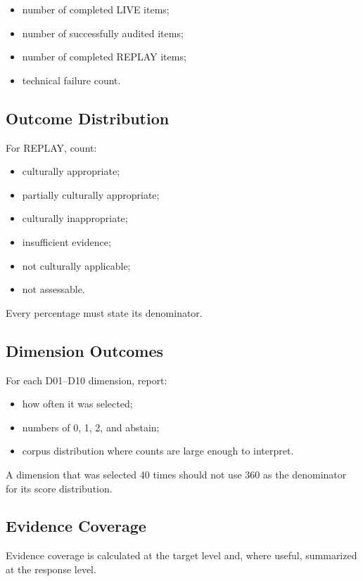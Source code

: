 \begin{itemize}
\item number of completed LIVE items;
\item number of successfully audited items;
\item number of completed REPLAY items;
\item technical failure count.
\end{itemize}

\subsection{Outcome Distribution}

For REPLAY, count:

\begin{itemize}
\item culturally appropriate;
\item partially culturally appropriate;
\item culturally inappropriate;
\item insufficient evidence;
\item not culturally applicable;
\item not assessable.
\end{itemize}

Every percentage must state its denominator.

\subsection{Dimension Outcomes}

For each D01--D10 dimension, report:

\begin{itemize}
\item how often it was selected;
\item numbers of 0, 1, 2, and abstain;
\item corpus distribution where counts are large enough to interpret.
\end{itemize}

A dimension that was selected 40 times should not use 360 as the denominator for its score distribution.

\subsection{Evidence Coverage}

Evidence coverage is calculated at the target level and, where useful, summarized at the response level.


